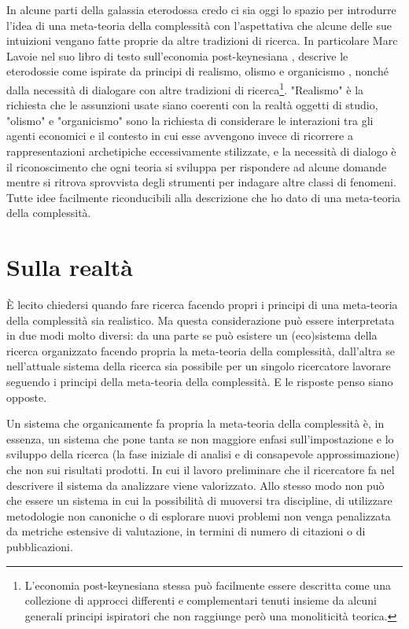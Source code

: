 \documentclass[a4paper, headings=standardclasses]{scrartcl}
\begin{document}
In alcune parti della galassia eterodossa credo ci sia oggi lo spazio per introdurre l'idea di una meta-teoria della complessità con l'aspettativa che alcune delle sue intuizioni vengano fatte proprie da altre tradizioni di ricerca.
In particolare Marc Lavoie nel suo libro di testo sull'economia post-keynesiana \parencite{lavoie2022}, descrive le eterodossie come ispirate da principi di realismo, olismo e organicismo \parencite[][p. 12]{lavoie2022}, nonché dalla necessità di dialogare con altre tradizioni di ricerca\footnote{L'economia post-keynesiana stessa può facilmente essere descritta come una collezione di approcci differenti e complementari tenuti insieme da alcuni generali principi ispiratori che non raggiunge però una monoliticità teorica.}. "Realismo" è la richiesta che le assunzioni usate siano coerenti con la realtà oggetti di studio, "olismo" e "organicismo" sono la richiesta di considerare le interazioni tra gli agenti economici e il contesto in cui esse avvengono invece di ricorrere a rappresentazioni archetipiche eccessivamente stilizzate, e la necessità di dialogo è il riconoscimento che ogni teoria si sviluppa per rispondere ad alcune domande mentre si ritrova sprovvista degli strumenti per indagare altre classi di fenomeni.
Tutte idee facilmente riconducibili alla descrizione che ho dato di una meta-teoria della complessità. 

\section{Sulla realtà}
È lecito chiedersi quando fare ricerca facendo propri i principi di una meta-teoria della complessità sia realistico.
Ma questa considerazione può essere interpretata in due modi molto diversi: da una parte se può esistere un (eco)sistema della ricerca organizzato facendo propria la meta-teoria della complessità, dall'altra se nell'attuale sistema della ricerca sia possibile per un singolo ricercatore lavorare seguendo i principi della meta-teoria della complessità. E le risposte penso siano opposte.

Un sistema che organicamente fa propria la meta-teoria della complessità è, in essenza, un sistema che pone tanta se non maggiore enfasi sull'impostazione e lo sviluppo della ricerca (la fase iniziale di analisi e di consapevole approssimazione) che non sui risultati prodotti. In cui il lavoro preliminare che il ricercatore fa nel descrivere il sistema da analizzare viene valorizzato.
Allo stesso modo non può che essere un sistema in cui la possibilità di muoversi tra discipline, di utilizzare metodologie non canoniche o di esplorare nuovi problemi non venga penalizzata da metriche estensive di valutazione, in termini di numero di citazioni o di pubblicazioni.
\end{document}
